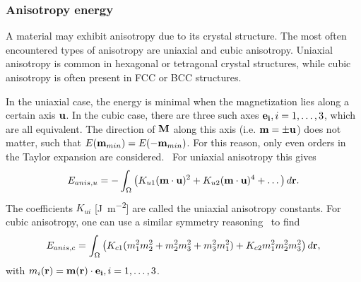 \documentclass[11pt,a4paper,english]{article}
\begin{document}
\subsubsection{Anisotropy energy}
A material may exhibit anisotropy due to its crystal structure. The most often encountered types of anisotropy are uniaxial and cubic anisotropy. Uniaxial anisotropy is common in hexagonal or tetragonal crystal structures, while cubic anisotropy is often present in FCC or BCC structures.~\cite{Gilbert1956, abert2013discrete} \par
In the uniaxial case, the energy is minimal when the magnetization lies along a certain axis $\vb{u}$. In the cubic case, there are three such axes $\vb{e_i}, i=1,\dots,3$, which are all equivalent. The direction of $\vb{M}$ along this axis (i.e. $\vb{m}=\pm \vb{u}$) does not matter, such that $E(\vb{m}_{min}) = E(-\vb{m}_{min})$. For this reason, only even orders in the Taylor expansion are considered.~\cite{abert2013discrete} For uniaxial anisotropy this gives
\begin{equation}
    E_{anis,u} = - \int_\Omega \big(K_{u1} (\vb{m} \cdot \vb{u})^2 + K_{u2} (\vb{m} \cdot \vb{u})^4 + \dots\big) \, d\vb{r} \mathrm{.} \label{eq:Energy_Term_AnisUniaxial}
\end{equation}
The coefficients $K_{ui}$ [\si{\joule\per\metre\squared}] are called the uniaxial anisotropy constants.
For cubic anisotropy, one can use a similar symmetry reasoning~\cite{abert2013discrete} to find
\begin{equation}
    E_{anis,c} = \int_\Omega \big(K_{c1} (m_1^2m_2^2 + m_2^2m_3^2 + m_3^2m_1^2) + K_{c2} m_1^2m_2^2m_3^2\big) \, d\vb{r} \mathrm{,} \label{eq:Energy_Term_AnisCubic}
\end{equation}
with $m_i(\vb{r}) = \vb{m}(\vb{r}) \cdot \vb{e_i}, i=1,\dots,3$.
\end{document}
